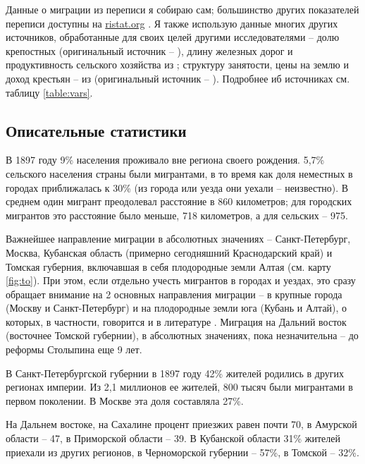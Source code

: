\documentclass[a4paper,12pt]{article}
\begin{document}
Данные о миграции из переписи я собираю сам; большинство других показателей переписи доступны на \href{http://ristat.org}{ristat.org} \citep{ristat_2020}. Я также использую данные многих других источников, обработанные для своих целей другими исследователями -- долю крепостных (оригинальный источник -- \cite{vremennik_1866}), длину железных дорог и продуктивность сельского хозяйства из \cite{markevich_abolition_2018}; структуру занятости, цены на землю и доход крестьян -- из \cite{lindert_inequality_2014} (оригинальный источник -- \cite{opyt_1906}). Подробнее иб источниках см. таблицу \ref{table:vars}.

\subsection{Описательные статистики}

В 1897 году 9\% населения проживало вне региона своего рождения. 5,7\% сельского населения страны были мигрантами, в то время как доля неместных в городах приближалась к 30\% (из города или уезда они уехали -- неизвестно). В среднем один мигрант преодолевал расстояние в 860 километров; для городских мигрантов это расстояние было меньше, 718 километров, а для сельских -- 975.


Важнейшее направление миграции в абсолютных значениях – Санкт-Петербург, Москва, Кубанская область (примерно сегодняшний Краснодарский край) и Томская губерния, включавшая в себя плодородные земли Алтая (см. карту \ref{fig:to}). При этом, если отдельно учесть мигрантов в городах и уездах, это сразу обращает внимание на 2 основных направления миграции – в крупные города (Москву и Санкт-Петербург) и на плодородные земли юга (Кубань и Алтай), о которых, в частности, говорится и в литературе \citep{anderson_internal_1980, leasure_internal_1968}. Миграция на Дальний восток (восточнее Томской губернии), в абсолютных значениях, пока незначительна – до реформы Столыпина еще 9 лет.

В Санкт-Петербургской губернии в 1897 году 42\% жителей родились в других регионах империи. Из 2,1 миллионов ее жителей, 800 тысяч были мигрантами в первом поколении. В Москве эта доля составляла 27\%.

На Дальнем востоке, на Сахалине процент приезжих равен почти 70, в Амурской области – 47, в Приморской области – 39. В Кубанской области 31\% жителей приехали из других регионов, в Черноморской губернии – 57\%, в Томской – 32\%.
\end{document}
